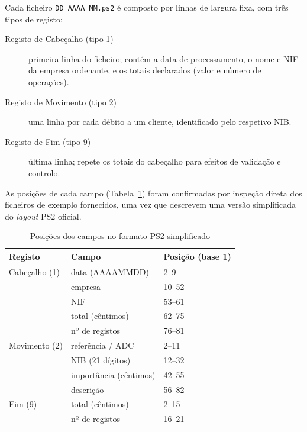 \documentclass[11pt,a4paper]{report}
\begin{document}
Cada ficheiro \texttt{DD\_AAAA\_MM.ps2} é composto por linhas de largura
fixa, com três tipos de registo:

\begin{description}
  \item[Registo de Cabeçalho (tipo 1)] primeira linha do ficheiro; contém a
    data de processamento, o nome e NIF da empresa ordenante, e os totais
    declarados (valor e número de operações).
  \item[Registo de Movimento (tipo 2)] uma linha por cada débito a um
    cliente, identificado pelo respetivo NIB.
  \item[Registo de Fim (tipo 9)] última linha; repete os totais do
    cabeçalho para efeitos de validação e controlo.
\end{description}

As posições de cada campo (Tabela~\ref{tab:layout}) foram confirmadas por
inspeção direta dos ficheiros de exemplo fornecidos, uma vez que descrevem
uma versão simplificada do \textit{layout} PS2 oficial.

\begin{table}[H]\centering
  \begin{tabular}{lll}
    \textbf{Registo} & \textbf{Campo} & \textbf{Posição (base 1)} \\ \hline
    Cabeçalho (1) & data (AAAAMMDD)         & 2--9   \\
                  & empresa                 & 10--52 \\
                  & NIF                     & 53--61 \\
                  & total (cêntimos)        & 62--75 \\
                  & nº de registos          & 76--81 \\ \hline
    Movimento (2) & referência / ADC        & 2--11  \\
                  & NIB (21 dígitos)        & 12--32 \\
                  & importância (cêntimos)  & 42--55 \\
                  & descrição               & 56--82 \\ \hline
    Fim (9)       & total (cêntimos)        & 2--15  \\
                  & nº de registos          & 16--21 \\
  \end{tabular}
  \caption{Posições dos campos no formato PS2 simplificado}\label{tab:layout}
\end{table}
\end{document}
